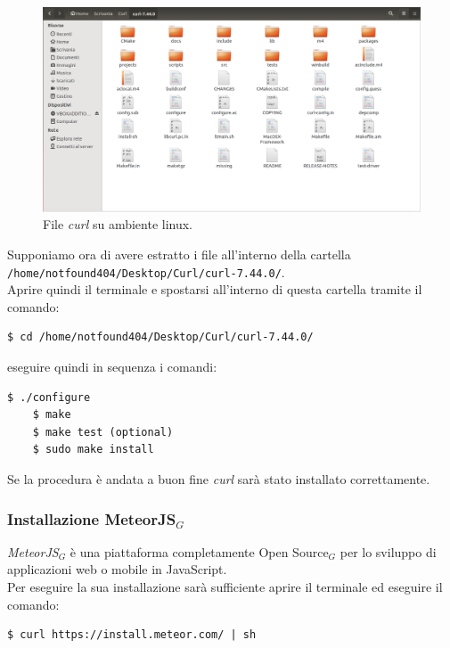 \begin{figure}[h]
\begin{center}
\includegraphics[scale=0.3]{img/curl_files_linux.png}
\caption{File \emph{curl} su ambiente linux.}
\end{center}
\end{figure}

\newpage
\noindent Supponiamo ora di avere estratto i file all'interno della cartella \\
\verb+/home/notfound404/Desktop/Curl/curl-7.44.0/+.\\
Aprire quindi il terminale e spostarsi all'interno di questa cartella tramite il comando:

\begin{lstlisting}[style=DOS]
	$ cd /home/notfound404/Desktop/Curl/curl-7.44.0/
\end{lstlisting}

eseguire quindi in sequenza i comandi:

\begin{lstlisting}[style=DOS]
	$ ./configure
	$ make
	$ make test (optional)
	$ sudo make install
\end{lstlisting}
Se la procedura è andata a buon fine \emph{curl} sarà stato installato correttamente.

\subsubsection{Installazione MeteorJS$_G$}
\emph{MeteorJS$_G$} è una piattaforma completamente Open Source$_G$ per lo sviluppo di applicazioni web o mobile in JavaScript.\\
Per eseguire la sua installazione sarà sufficiente aprire il terminale ed eseguire il comando:

\begin{lstlisting}[style=DOS]
	$ curl https://install.meteor.com/ | sh
\end{lstlisting}

